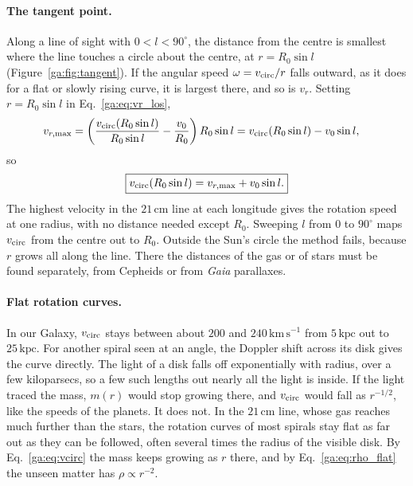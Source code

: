 \paragraph{The tangent point.} Along a line of sight with $0<l<90^\circ$, the distance from the centre is smallest where the line touches a circle about the centre, at $r=R_0\sin l$ (Figure~\ref{ga:fig:tangent}). If the angular speed $\omega=v_{\rm circ}/r$ falls outward, as it does for a flat or slowly rising curve, it is largest there, and so is $v_r$. Setting $r=R_0\sin l$ in Eq.~\eqref{ga:eq:vr_los},
\begin{align}
	v_{r,\max}
	&= \left(\frac{v_{\rm circ}(R_0\sin l)}{R_0\sin l}-\frac{v_0}{R_0}\right)R_0\sin l
	= v_{\rm circ}(R_0\sin l)-v_0\sin l,
\end{align}
so
\begin{equation}
	\boxed{v_{\rm circ}(R_0\sin l)=v_{r,\max}+v_0\sin l.}
	\label{ga:eq:tangent}
\end{equation}
The highest velocity in the $21\,\mathrm{cm}$ line at each longitude gives the rotation speed at one radius, with no distance needed except $R_0$. Sweeping $l$ from $0$ to $90^\circ$ maps $v_{\rm circ}$ from the centre out to $R_0$. Outside the Sun's circle the method fails, because $r$ grows all along the line. There the distances of the gas or of stars must be found separately, from Cepheids or from \emph{Gaia} parallaxes.

\paragraph{Flat rotation curves.} In our Galaxy, $v_{\rm circ}$ stays between about $200$ and $240\,\mathrm{km\,s^{-1}}$ from $5\,\mathrm{kpc}$ out to $25\,\mathrm{kpc}$. For another spiral seen at an angle, the Doppler shift across its disk gives the curve directly. The light of a disk falls off exponentially with radius, over a few kiloparsecs, so a few such lengths out nearly all the light is inside. If the light traced the mass, $m(r)$ would stop growing there, and $v_{\rm circ}$ would fall as $r^{-1/2}$, like the speeds of the planets. It does not. In the $21\,\mathrm{cm}$ line, whose gas reaches much further than the stars, the rotation curves of most spirals stay flat as far out as they can be followed, often several times the radius of the visible disk. By Eq.~\eqref{ga:eq:vcirc} the mass keeps growing as $r$ there, and by Eq.~\eqref{ga:eq:rho_flat} the unseen matter has $\rho\propto r^{-2}$.

